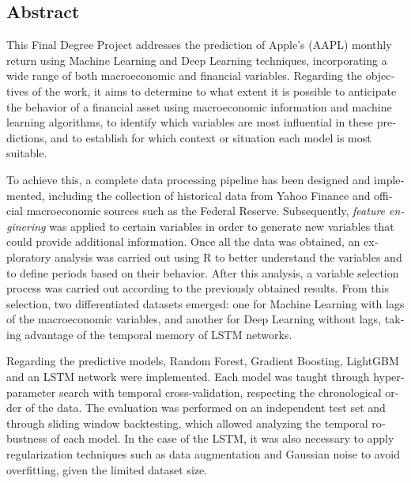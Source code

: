 \begin{otherlanguage}{english}
  \chapter*{Abstract}

This Final Degree Project addresses the prediction of Apple's (AAPL) monthly return using Machine Learning and Deep Learning techniques, incorporating a wide range of both macroeconomic and financial variables. Regarding the objectives of the work, it aims to determine to what extent it is possible to anticipate the behavior of a financial asset using macroeconomic information and machine learning algorithms, to identify which variables are most influential in these predictions, and to establish for which context or situation each model is most suitable.

To achieve this, a complete data processing pipeline has been designed and implemented, including the collection of historical data from Yahoo Finance and official macroeconomic sources such as the Federal Reserve. Subsequently, \emph{feature enginering} was applied to certain variables in order to generate new variables that could provide additional information. Once all the data was obtained, an exploratory analysis was carried out using R to better understand the variables and to define periods based on their behavior. After this analysis, a variable selection process was carried out according to the previously obtained results. From this selection, two differentiated datasets emerged: one for Machine Learning with lags of the macroeconomic variables, and another for Deep Learning without lags, taking advantage of the temporal memory of LSTM networks.

Regarding the predictive models, Random Forest, Gradient Boosting, LightGBM and an LSTM network were implemented. Each model was taught through hyperparameter search with temporal cross-validation, respecting the chronological order of the data. The evaluation was performed on an independent test set and through sliding window backtesting, which allowed analyzing the temporal robustness of each model. In the case of the LSTM, it was also necessary to apply regularization techniques such as data augmentation and Gaussian noise to avoid overfitting, given the limited dataset size.

\end{otherlanguage}